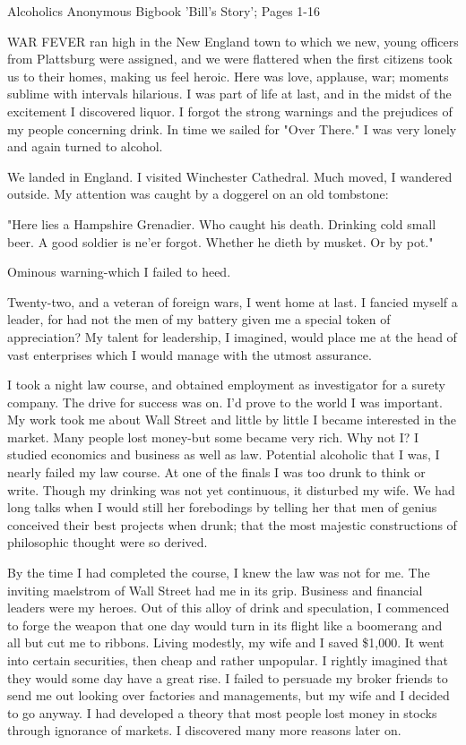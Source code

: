 

Alcoholics Anonymous Bigbook 'Bill's Story'; Pages 1-16


\begin{biblechatper}
WAR FEVER ran high in the New England town to which we new, young officers from Plattsburg were assigned, 
and we were flattered when the first citizens took us to their homes, making us feel heroic.
Here was love, applause, war; 
moments sublime with intervals hilarious.
I was part of life at last, and in the midst of the excitement I discovered liquor.
I forgot the strong warnings and the prejudices of my people concerning drink.
In time we sailed for "Over There."
I was very lonely and again turned to alcohol.

We landed in England.
I visited Winchester Cathedral.
Much moved, I wandered outside.
My attention was caught by a doggerel on an old tombstone:

"Here lies a Hampshire Grenadier.
Who caught his death.
Drinking cold small beer.
A good soldier is ne'er forgot.
Whether he dieth by musket.
Or by pot."

Ominous warning-which I failed to heed.

Twenty-two, and a veteran of foreign wars, I went home at last.
I fancied myself a leader, for had not the men of my battery given me a special token of appreciation?
My talent for leadership, I imagined, would place me at the head of vast enterprises which I would manage with the utmost assurance.

I took a night law course, and obtained employment as investigator for a surety company.
The drive for success was on.
I'd prove to the world I was important.
My work took me about Wall Street and little by little I became interested in the market.
Many people lost money-but some became very rich.
Why not I?
I studied economics and business as well as law.
Potential  alcoholic that I was, I nearly failed my law course.
At one of the finals I was too drunk to think or write.
Though my drinking was not yet continuous, it disturbed my wife.
We had long talks when I would still her forebodings by telling her that men of genius conceived their best projects when drunk; that the most majestic constructions of philosophic thought were so derived.

By the time I had completed the course, I knew the law was not for me.
The inviting maelstrom of Wall Street had me in its grip.
Business and financial leaders were my heroes.
Out of this alloy of drink and speculation, I commenced to forge the weapon that one day would turn in its flight like a boomerang and all but cut me to ribbons.
Living modestly, my wife and I saved \$1,000.
It went into certain securities, then cheap and rather unpopular.
I rightly imagined that they would some day have a great rise.
I failed to persuade my broker friends to send me out looking over factories and managements, but my wife and I decided to go anyway.
I had developed a theory that most people lost money in stocks through ignorance of markets.
I discovered many more reasons later on.


\end{biblechatper}

